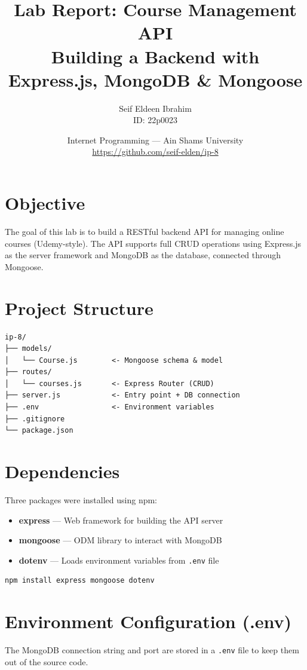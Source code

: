 \documentclass[12pt,a4paper]{article}
\title{\textbf{Lab Report: Course Management API} \\ \large Building a Backend with Express.js, MongoDB \& Mongoose}
\author{Seif Eldeen Ibrahim \\ ID: 22p0023}
\date{Internet Programming --- Ain Shams University \\ \small\url{https://github.com/seif-elden/ip-8}}
\begin{document}
\maketitle
\tableofcontents
\newpage

\section{Objective}
The goal of this lab is to build a RESTful backend API for managing online courses (Udemy-style). The API supports full CRUD operations using Express.js as the server framework and MongoDB as the database, connected through Mongoose.

\section{Project Structure}
\begin{lstlisting}
ip-8/
├── models/
│   └── Course.js        <- Mongoose schema & model
├── routes/
│   └── courses.js       <- Express Router (CRUD)
├── server.js            <- Entry point + DB connection
├── .env                 <- Environment variables
├── .gitignore
└── package.json
\end{lstlisting}

\section{Dependencies}
Three packages were installed using npm:
\begin{itemize}
  \item \textbf{express} --- Web framework for building the API server
  \item \textbf{mongoose} --- ODM library to interact with MongoDB
  \item \textbf{dotenv} --- Loads environment variables from \texttt{.env} file
\end{itemize}

\begin{lstlisting}[language=bash]
npm install express mongoose dotenv
\end{lstlisting}

\section{Environment Configuration (.env)}
The MongoDB connection string and port are stored in a \texttt{.env} file to keep them out of the source code.
\end{document}
